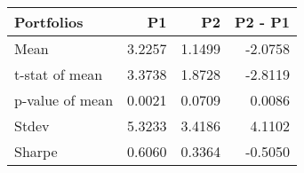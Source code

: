 \begin{tabular}{lrrr}
\toprule
Portfolios & P1 & P2 & P2 - P1 \\
\midrule
Mean & 3.2257 & 1.1499 & -2.0758 \\
t-stat of mean & 3.3738 & 1.8728 & -2.8119 \\
p-value of mean & 0.0021 & 0.0709 & 0.0086 \\
Stdev & 5.3233 & 3.4186 & 4.1102 \\
Sharpe & 0.6060 & 0.3364 & -0.5050 \\
\bottomrule
\end{tabular}
